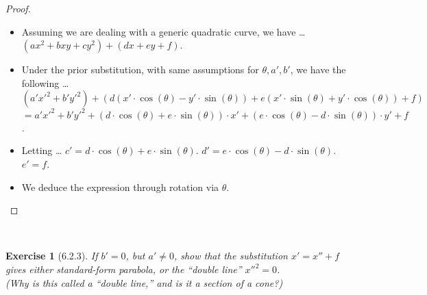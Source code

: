 \documentclass[12pt]{article}
\newcommand{\XB}{\color{black}}
\newcommand{\XBB}{\color{blue}}
\newcommand{\ds}{\displaystyle}
\theoremstyle{plain}
\newtheorem{ex}{Exercise}
\begin{document}
\begin{proof}
  \ \\

  \begin{itemize}
    \item Assuming we are dealing with a generic quadratic curve, we have \dots
    \subitem $ \ds ( ax^{2} + bxy + cy^{2} ) + ( dx + ey + f ) $.
    \item Under the prior substitution, with same assumptions for $ \theta, a', b' $, we have the following \dots
    \subitem $ \ds ( a'x'^{2} + b'y'^{2} ) + ( d ( x' \cdot \cos(\theta) - y' \cdot \sin(\theta) ) + e( x' \cdot \sin(\theta) + y' \cdot \cos(\theta) ) + f ) $
    \subitem $ \ds = a'x'^{2} + b'y'^{2} + ( d \cdot \cos(\theta) + e \cdot \sin(\theta)) \cdot x' + ( e \cdot \cos(\theta) - d \cdot \sin(\theta) ) \cdot y' + f $.
    \item Letting \dots
    \subitem $ \ds c' = d \cdot \cos(\theta) + e \cdot \sin(\theta) $.
    \subitem $ \ds d' = e \cdot \cos(\theta) - d \cdot \sin(\theta) $.
    \subitem $ \ds e' = f $.
    \item We deduce the expression through rotation via $ \theta $.
  \end{itemize}

\end{proof}

\newpage


\XBB\hrulefill\XB \\
\begin{ex} [6.2.3]
  If $ b' = 0 $, but $ a' \neq 0 $, show that the substitution $ x' = x'' + f $ gives either standard-form parabola, 
  or the ``double line'' $ x''^{2} = 0 $. \\
  (Why is this called a ``double line,'' and is it a section of a cone?)
\end{ex}
\XBB\hrulefill\XB \\
\end{document}
